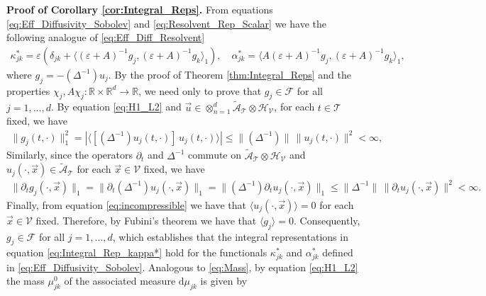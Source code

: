\documentclass[11pt]{amsart}
\renewcommand{\d}{\mathrm{d}}
\newcommand{\Tc}{\mathcal{T}}
\newcommand{\Vc}{\mathcal{V}}
\newcommand{\Hc}{\mathcal{H}}
\newcommand{\Fc}{\mathcal{F}}
\newcommand{\As}{\mathscr{A}}
\begin{document}
\textbf{Proof of Corollary \ref{cor:Integral_Reps}.}\hspace{1ex}
%
From equations \eqref{eq:Eff_Diffusivity_Sobolev} and
\eqref{eq:Resolvent_Rep_Scalar} we have the following analogue of
\eqref{eq:Eff_Diff_Resolvent}
%
\begin{align}\label{eq:Eff_Diff_Resolvent_Sobelov}
 \kappa^*_{jk}=\varepsilon\left(\delta_{jk}+\langle(\varepsilon+A)^{-1}g_j,(\varepsilon+A)^{-1}g_k\rangle_1\right), \quad
 \alpha^*_{jk}=\langle A(\varepsilon+A)^{-1}g_j,(\varepsilon+A)^{-1}g_k\rangle_1,
\end{align}
%
where $g_j=-(\Delta^{-1})u_j$. By the proof of Theorem
\ref{thm:Integral_Reps} and the properties
$\chi_j,A\chi_j:\mathbb{R}\times\mathbb{R}^d\to\mathbb{R}$, we need only to prove
that $g_j\in\Fc$ for all $j=1,\ldots,d$. By equation \eqref{eq:H1_L2} and
$\vec{u}\in\otimes_{n=1}^d\tilde{\As}_{\Tc}\otimes\Hc_{\Vc}$, for each $t\in\Tc$
fixed, we have 
%
\begin{align}
  \|g_j(t,\cdot)\|_1^2%
             =|\langle[(\Delta^{-1})u_j(t,\cdot)]\,u_j(t,\cdot)\rangle|
             \leq\|(\Delta^{-1})\|\,\|u_j(t,\cdot)\|^2<\infty,
\end{align}
%
Similarly, since the operators $\partial_t$ and $\Delta^{-1}$ commute on
$\tilde{\As}_{\Tc}\otimes\Hc_{\Vc}$ and $u_j(\cdot,\vec{x})\in\tilde{\As}_{\Tc}$
for each $\vec{x}\in\Vc$ fixed, we have 
%
\begin{align}
  \|\partial_tg_j(\cdot,\vec{x})\|_1=\|\partial_t(\Delta^{-1})u_j(\cdot,\vec{x})\|_1
                    =\|(\Delta^{-1})\partial_tu_j(\cdot,\vec{x})\|_1
                    \leq\|\Delta^{-1}\|\,\|\partial_tu_j(\cdot,\vec{x})\|^2<\infty.
\end{align}
%
Finally, from equation \eqref{eq:incompressible} we have that
$\langle u_j(\cdot,\vec{x})\rangle=0$ for each $\vec{x}\in\Vc$ fixed. Therefore, by 
Fubini's theorem \cite{Folland:99} we have that
$\langle g_j\rangle=0$. Consequently, $g_j\in\Fc$ for all $j=1,\ldots,d$, which 
establishes that the integral representations in equation
\eqref{eq:Integral_Rep_kappa*} hold for the functionals $\kappa^*_{jk}$ and
$\alpha^*_{jk}$ defined in \eqref{eq:Eff_Diffusivity_Sobolev}. Analogous to
\eqref{eq:Mass}, by equation \eqref{eq:H1_L2} the mass
$\mu^0_{jk}$ of the associated measure $\d\mu_{jk}$ is given by  
\end{document}
